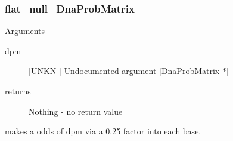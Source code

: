 \subsubsection{flat_null_DnaProbMatrix}

Arguments
\begin{description}
\item[dpm] [UNKN ] Undocumented argument [DnaProbMatrix *]
\item[returns] Nothing - no return value
\end{description}
makes a odds of dpm via a 0.25 factor 
into each base.


